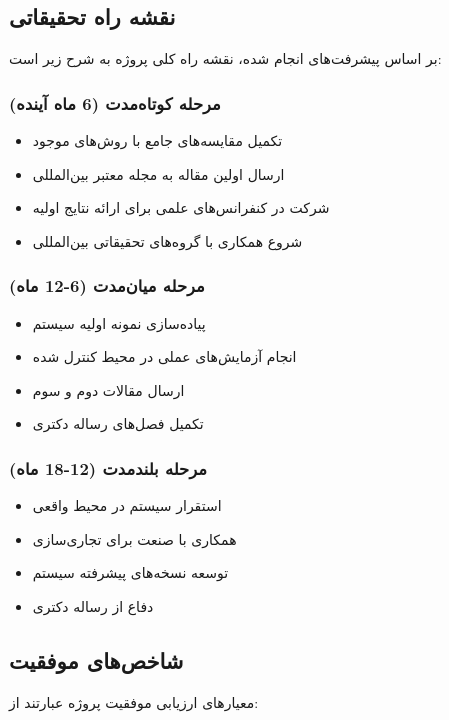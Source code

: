 \documentclass[11pt]{article}
\begin{document}
\subsection{نقشه راه تحقیقاتی}

بر اساس پیشرفت‌های انجام شده، نقشه راه کلی پروژه به شرح زیر است:

\subsubsection{مرحله کوتاه‌مدت (6 ماه آینده)}
\begin{itemize}
\item تکمیل مقایسه‌های جامع با روش‌های موجود
\item ارسال اولین مقاله به مجله معتبر بین‌المللی
\item شرکت در کنفرانس‌های علمی برای ارائه نتایج اولیه
\item شروع همکاری با گروه‌های تحقیقاتی بین‌المللی
\end{itemize}

\subsubsection{مرحله میان‌مدت (6-12 ماه)}
\begin{itemize}
\item پیاده‌سازی نمونه اولیه سیستم
\item انجام آزمایش‌های عملی در محیط کنترل شده
\item ارسال مقالات دوم و سوم
\item تکمیل فصل‌های رساله دکتری
\end{itemize}

\subsubsection{مرحله بلندمدت (12-18 ماه)}
\begin{itemize}
\item استقرار سیستم در محیط واقعی
\item همکاری با صنعت برای تجاری‌سازی
\item توسعه نسخه‌های پیشرفته سیستم
\item دفاع از رساله دکتری
\end{itemize}

\subsection{شاخص‌های موفقیت}

معیارهای ارزیابی موفقیت پروژه عبارتند از:
\end{document}
